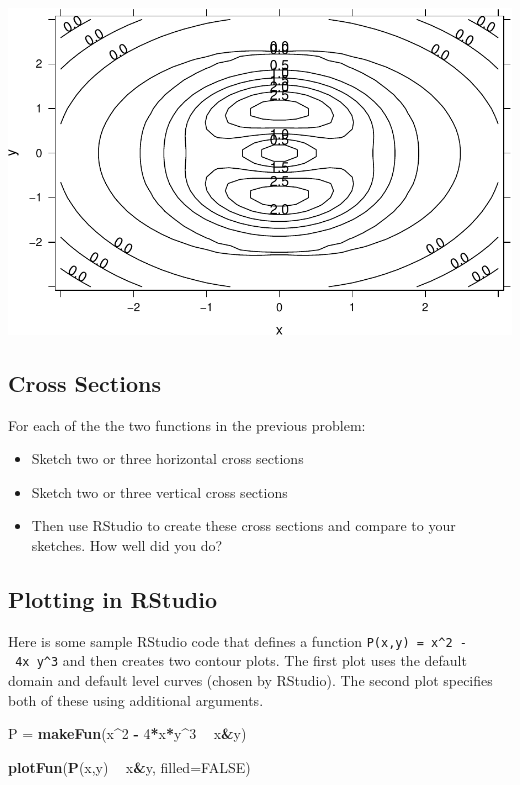 \documentclass[
]{book}
\newenvironment{Shaded}{\begin{snugshade}}{\end{snugshade}}
\newcommand{\DataTypeTok}[1]{\textcolor[rgb]{0.13,0.29,0.53}{#1}}
\newcommand{\DecValTok}[1]{\textcolor[rgb]{0.00,0.00,0.81}{#1}}
\newcommand{\KeywordTok}[1]{\textcolor[rgb]{0.13,0.29,0.53}{\textbf{#1}}}
\newcommand{\NormalTok}[1]{#1}
\newcommand{\OperatorTok}[1]{\textcolor[rgb]{0.81,0.36,0.00}{\textbf{#1}}}
\newcommand{\OtherTok}[1]{\textcolor[rgb]{0.56,0.35,0.01}{#1}}
\newcommand{\StringTok}[1]{\textcolor[rgb]{0.31,0.60,0.02}{#1}}
\providecommand{\tightlist}{%
  \setlength{\itemsep}{0pt}\setlength{\parskip}{0pt}}
\begin{document}
\includegraphics{_bookdown_files/math135_handbook_files/figure-latex/unnamed-chunk-74-1.pdf}

\hypertarget{cross-sections}{%
\subsection{Cross Sections}\label{cross-sections}}

For each of the the two functions in the previous problem:

\begin{itemize}
\tightlist
\item
  Sketch two or three horizontal cross sections
\item
  Sketch two or three vertical cross sections
\item
  Then use RStudio to create these cross sections and compare to your sketches. How well did you do?
\end{itemize}

\hypertarget{plotting-in-rstudio-1}{%
\subsection{Plotting in RStudio}\label{plotting-in-rstudio-1}}

Here is some sample RStudio code that defines a function \texttt{P(x,y)\ =\ x\^{}2\ -\ 4x\ y\^{}3} and then creates two contour plots. The first plot uses the default domain and default level curves (chosen by RStudio). The second plot specifies both of these using additional arguments.

\begin{Shaded}
\begin{Highlighting}[]
\NormalTok{P =}\StringTok{ }\KeywordTok{makeFun}\NormalTok{(x}\OperatorTok{^}\DecValTok{2} \OperatorTok{-}\StringTok{ }\DecValTok{4}\OperatorTok{*}\NormalTok{x}\OperatorTok{*}\NormalTok{y}\OperatorTok{^}\DecValTok{3} \OperatorTok{~}\StringTok{ }\NormalTok{x}\OperatorTok{&}\NormalTok{y)}

\KeywordTok{plotFun}\NormalTok{(}\KeywordTok{P}\NormalTok{(x,y) }\OperatorTok{~}\StringTok{ }\NormalTok{x}\OperatorTok{&}\NormalTok{y, }\DataTypeTok{filled=}\OtherTok{FALSE}\NormalTok{)}
\end{Highlighting}
\end{Shaded}
\end{document}
